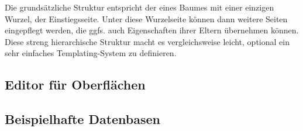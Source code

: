 Die grundsätzliche Struktur entspricht der eines Baumes mit einer einzigen Wurzel, der Einstiegsseite. Unter diese Wurzelseite können dann weitere Seiten eingepflegt werden, die ggfs. auch Eigenschaften ihrer Eltern übernehmen können. Diese streng hierarchische Struktur macht es vergleichsweise leicht, optional ein sehr einfaches Templating-System zu definieren.

\subsection{Editor für Oberflächen}


\subsection{Beispielhafte Datenbasen}
\label{sec:example-queries}

